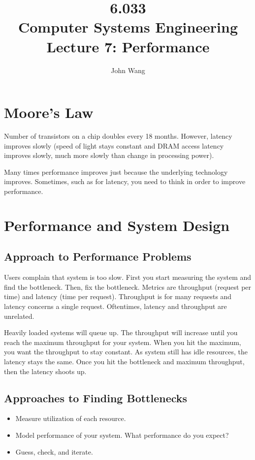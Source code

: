 \documentclass[psamsfonts]{amsart}
\title{6.033 \\
Computer Systems Engineering \\
Lecture 7: Performance}
\author{John Wang}
\begin{document}
\maketitle

\section{Moore's Law}

Number of transistors on a chip doubles every 18 months. However, latency improves slowly (speed of light stays constant and DRAM access latency improves slowly, much more slowly than change in processing power).

Many times performance improves just because the underlying technology improves. Sometimes, such as for latency, you need to think in order to improve performance.

\section{Performance and System Design}

\subsection{Approach to Performance Problems}

Users complain that system is too slow. First you start measuring the system and find the bottleneck. Then, fix the bottleneck. Metrics are throughput (request per time) and latency (time per request). Throughput is for many requests and latency concerns a single request. Oftentimes, latency and throughput are unrelated.

Heavily loaded systems will queue up. The throughput will increase until you reach the maximum throughput for your system. When you hit the maximum, you want the throughput to stay constant. As system still has idle resources, the latency stays the same. Once you hit the bottleneck and maximum throughput, then the latency shoots up.

\subsection{Approaches to Finding Bottlenecks}

\begin{itemize}
  \item Measure utilization of each resource.
  \item Model performance of your system. What performance do you expect?
  \item Guess, check, and iterate.
\end{itemize}
\end{document}
